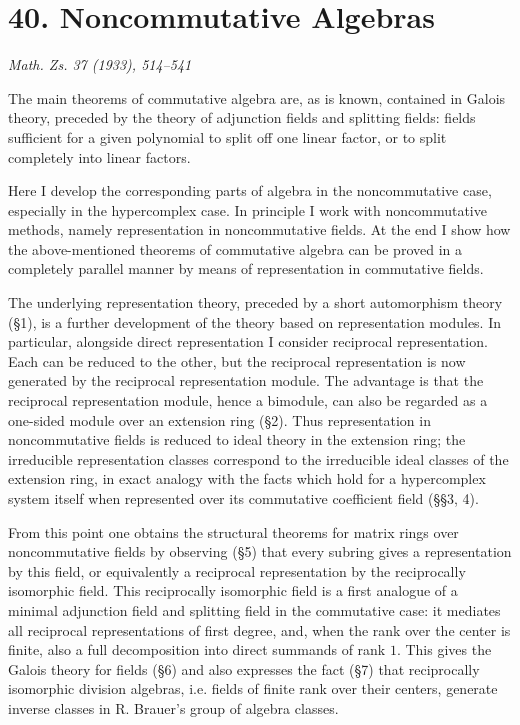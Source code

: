 \documentclass[11pt]{article}
\begin{document}
\clearpage

\section*{40. Noncommutative Algebras}

\begin{center}
\emph{Math. Zs. 37 (1933), 514--541}
\end{center}

The main theorems of commutative algebra are, as is known, contained in Galois theory, preceded by the theory of adjunction fields and splitting fields: fields sufficient for a given polynomial to split off one linear factor, or to split completely into linear factors.

Here I develop the corresponding parts of algebra in the noncommutative case, especially in the hypercomplex case. In principle I work with noncommutative methods, namely representation in noncommutative fields. At the end I show how the above-mentioned theorems of commutative algebra can be proved in a completely parallel manner by means of representation in commutative fields.

The underlying representation theory, preceded by a short automorphism theory (§1), is a further development of the theory based on representation modules. In particular, alongside direct representation I consider reciprocal representation. Each can be reduced to the other, but the reciprocal representation is now generated by the reciprocal representation module. The advantage is that the reciprocal representation module, hence a bimodule, can also be regarded as a one-sided module over an extension ring (§2). Thus representation in noncommutative fields is reduced to ideal theory in the extension ring; the irreducible representation classes correspond to the irreducible ideal classes of the extension ring, in exact analogy with the facts which hold for a hypercomplex system itself when represented over its commutative coefficient field (§§3, 4).

From this point one obtains the structural theorems for matrix rings over noncommutative fields by observing (§5) that every subring gives a representation by this field, or equivalently a reciprocal representation by the reciprocally isomorphic field. This reciprocally isomorphic field is a first analogue of a minimal adjunction field and splitting field in the commutative case: it mediates all reciprocal representations of first degree, and, when the rank over the center is finite, also a full decomposition into direct summands of rank \(1\). This gives the Galois theory for fields (§6) and also expresses the fact (§7) that reciprocally isomorphic division algebras, i.e. fields of finite rank over their centers, generate inverse classes in R. Brauer's group of algebra classes.
\end{document}
